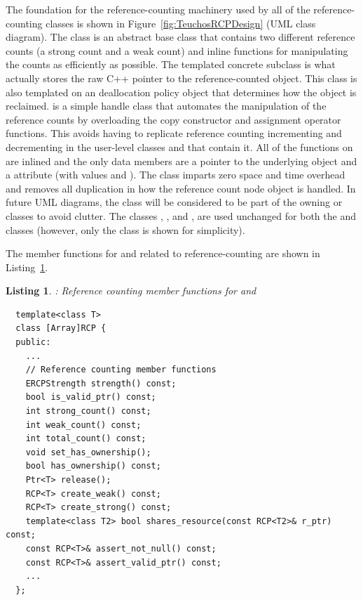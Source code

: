 \documentclass[pdf,ps2pdf,11pt]{SANDreport}
\newtheorem{listing}{Listing}
\begin{document}
The foundation for the reference-counting machinery used by all of the
reference-counting classes is shown in
Figure~\ref{fig:TeuchosRCPDesign} (UML class diagram).  The class
{} is an abstract base class that contains two different
reference counts (a strong count and a weak count) and inline
functions for manipulating the counts as efficiently as possible.  The
templated concrete subclass {} is what actually
stores the raw C++ pointer to the reference-counted object.  This
class is also templated on an deallocation policy object that
determines how the object is reclaimed.  {} is a
simple handle class that automates the manipulation of the reference
counts by overloading the copy constructor and assignment operator
functions.  This avoids having to replicate reference counting
incrementing and decrementing in the user-level classes {}
and {} that contain it.  All of the functions on
{} are inlined and the only data members are a
pointer to the underlying {} object and a
{} attribute (with values {} and
{}).  The class {} imparts zero
space and time overhead and removes all duplication in how the
reference count node object is handled.  In future UML diagrams, the
{} class will be considered to be part of the
owning {} or {} classes to avoid clutter.  The
classes {}, {}, and
{}, are used unchanged for both the {} and
{} classes (however, only the {} class is shown
for simplicity).

The member functions for {} and {} related to
reference-counting are shown in Listing~\ref{listing:ref-count-mem-funcs}.


{}\begin{listing}: Reference counting member functions for {}
and {}
\label{listing:ref-count-mem-funcs}
{\small\begin{verbatim}
  template<class T>
  class [Array]RCP {
  public:
    ...
    // Reference counting member functions
    ERCPStrength strength() const;
    bool is_valid_ptr() const;
    int strong_count() const;
    int weak_count() const;
    int total_count() const;
    void set_has_ownership();
    bool has_ownership() const;
    Ptr<T> release();
    RCP<T> create_weak() const;
    RCP<T> create_strong() const;
    template<class T2> bool shares_resource(const RCP<T2>& r_ptr) const;
    const RCP<T>& assert_not_null() const;
    const RCP<T>& assert_valid_ptr() const;
    ...
  };
\end{verbatim}}
\end{listing}
\end{document}
